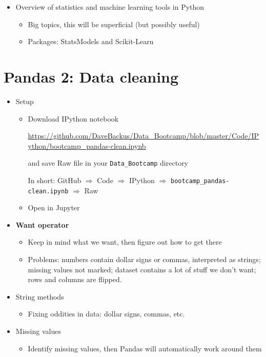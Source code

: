 \documentclass[11pt]{article}
\begin{document}
\begin{itemize}
\item Overview of statistics and machine learning tools in Python
\begin{itemize}
\item Big topics, this will be superficial (but possibly useful)
\item Packages:  StatsModels and Scikit-Learn
\end{itemize}

\end{itemize}

\section*{Pandas 2:  Data cleaning}

\begin{itemize}
\item Setup
\begin{itemize}
\item Download IPython notebook

\url{https://github.com/DaveBackus/Data_Bootcamp/blob/master/Code/IPython/bootcamp_pandas-clean.ipynb}

and save Raw file in your \verb|Data_Bootcamp| directory

In short:  GitHub $\Rightarrow$ Code $\Rightarrow$ IPython $\Rightarrow$
 \verb|bootcamp_pandas-clean.ipynb| $\Rightarrow$ Raw

\item Open in Jupyter
\end{itemize}

\item {\bf Want operator}
\begin{itemize}
\item Keep in mind what we want, then figure out how to get there
\item Problems:  numbers contain dollar signs or commas, interpreted as strings;
missing values not marked;
dataset contains a lot of stuff we don't want; rows and columns are flipped.
\end{itemize}

\item String methods
\begin{itemize}
\item Fixing oddities in data:  dollar signs, commas, etc.
\end{itemize}

\item Missing values
\begin{itemize}
\item Identify missing values, then Pandas will automatically work around them
\end{itemize}


\end{itemize}
\end{document}
